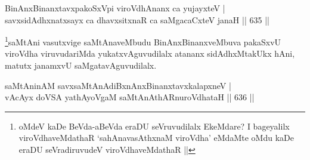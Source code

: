 
\begin{shl}
BinAnxBinanxtavxpakoSxV\s pi viroVdhAnanx ca yujayxteV | \\
savxsidAdhxnatxsayx ca dhavxsitxnaR ca saMgacaCxteV janaH \hfill||  635 ||  
\end{shl}

\begin{artha}
\footnote{oMdeV kaDe BeVda-aBeVda eraDU seVruvudilalx EkeMdare? I bageyalilx viroVdhaveMdathaR `sahAnavasAthxnaM viroVdha' eMdaMte oMdu kaDe eraDU seVradiruvudeV viroVdhaveMdathaR ||}saMtAni vasutxvige saMtAnaveMbudu BinAnxBinanxveMbuva pakaSxvU viroVdha viruvudariMda yukatxvAguvudilalx atananx sidAdhxMtakUkx hAni, matutx janamxvU saMgatavAguvudilalx.
\end{artha}

\begin{shl}
saMtAninAM savxsaMtAnAdiBxnAnxBinanxtavxkalapxneV | \\
vAcAyx doVSA yathAyoVgaM saMtAnAthARnuroVdhataH \hfill ||  636 ||  
\end{shl}

